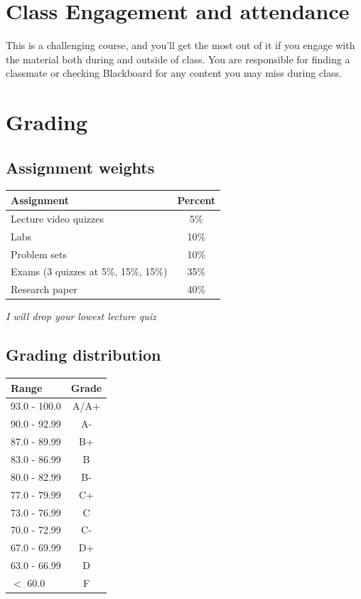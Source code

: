 \documentclass[
]{article}
\begin{document}
\hypertarget{class-engagement-and-attendance}{%
\section*{Class Engagement and
attendance}\label{class-engagement-and-attendance}}

This is a challenging course, and you'll get the most out of it if you
engage with the material both during and outside of class. You are
responsible for finding a classmate or checking Blackboard for any
content you may miss during class.

\hypertarget{grading}{%
\section*{Grading}\label{grading}}

\hypertarget{assignment-weights}{%
\subsection*{Assignment weights}\label{assignment-weights}}

\begin{longtable}[]{@{}lc@{}}
\toprule
Assignment & Percent \\
\midrule
\endhead
Lecture video quizzes & 5\% \\
Labs & 10\% \\
Problem sets & 10\% \\
Exams (3 quizzes at 5\%, 15\%, 15\%) & 35\% \\
Research paper & 40\% \\
\bottomrule
\end{longtable}

\emph{I will drop your lowest lecture quiz}

\hypertarget{grading-distribution}{%
\subsection*{Grading distribution}\label{grading-distribution}}

\begin{longtable}[]{@{}lc@{}}
\toprule
Range & Grade \\
\midrule
\endhead
93.0 - 100.0 & A/A+ \\
90.0 - 92.99 & A- \\
87.0 - 89.99 & B+ \\
83.0 - 86.99 & B \\
80.0 - 82.99 & B- \\
77.0 - 79.99 & C+ \\
73.0 - 76.99 & C \\
70.0 - 72.99 & C- \\
67.0 - 69.99 & D+ \\
63.0 - 66.99 & D \\
\(<\) 60.0 & F \\
\bottomrule
\end{longtable}
\end{document}

